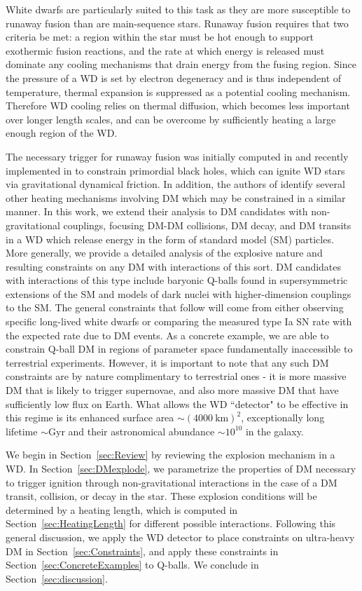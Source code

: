 \documentclass[twocolumn,showpacs,preprintnumbers,amsmath,amssymb,prd]{revtex4}
\begin{document}
White dwarfs are particularly suited to this task as they are more susceptible to runaway fusion than are main-sequence stars.
Runaway fusion requires that two criteria be met: a region within the star must be hot enough to support exothermic fusion reactions, and the rate at which energy is released must dominate any cooling mechanisms that drain energy from the fusing region.
Since the pressure of a WD is set by electron degeneracy and is thus independent of temperature, thermal expansion is suppressed as a potential cooling mechanism.
Therefore WD cooling relies on thermal diffusion, which becomes less important over longer length scales, and can be overcome by sufficiently heating a large enough region of the WD.

The necessary trigger for runaway fusion was initially computed in \cite{Woosley} and recently implemented in \cite{Graham:2015apa} to constrain primordial black holes, which can ignite WD stars via gravitational dynamical friction.
 In addition, the authors of \cite{Graham:2015apa} identify several other heating mechanisms involving DM which may be constrained in a similar manner.
In this work, we extend their analysis to DM candidates with non-gravitational couplings, focusing DM-DM collisions, DM decay, and DM transits in a WD which release energy in the form of standard model (SM) particles.
More generally, we provide a detailed analysis of the explosive nature and resulting constraints on any DM with interactions of this sort.
DM candidates with interactions of this type include baryonic Q-balls found in supersymmetric extensions of the SM and models of dark nuclei with higher-dimension couplings to the SM.
The general constraints that follow will come from either observing specific long-lived white dwarfs or comparing the measured type Ia SN rate with the expected rate due to DM events.
As a concrete example, we are able to constrain Q-ball DM in regions of parameter space fundamentally inaccessible to terrestrial experiments.
However, it is important to note that any such DM constraints are by nature complimentary to terrestrial ones - it is more massive DM that is likely to trigger supernovae, and also more massive DM that have sufficiently low flux on Earth.
What allows the WD ``detector" to be effective in this regime is its enhanced surface area $\sim (4000 ~\text{km})^2$, exceptionally long lifetime $\sim \text{Gyr}$ and their astronomical abundance $\sim 10^{10}$ in the galaxy.


We begin in Section~\ref{sec:Review} by reviewing the explosion mechanism in a WD.
In Section~\ref{sec:DMexplode}, we parametrize the properties of DM necessary to trigger ignition through non-gravitational interactions in the case of a DM transit, collision, or decay in the star.
These explosion conditions will be determined by a heating length, which is computed in Section~\ref{sec:HeatingLength} for different possible interactions.
Following this general discussion, we apply the WD detector to place constraints on ultra-heavy DM in Section~\ref{sec:Constraints}, and apply these constraints in Section~\ref{sec:ConcreteExamples} to Q-balls.
We conclude in Section~\ref{sec:discussion}.
\end{document}
